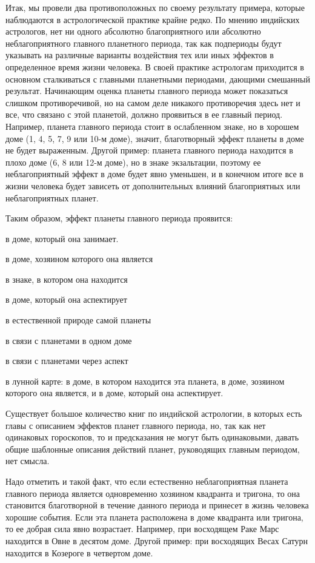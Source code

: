 Итак, мы провели два противоположных по своему результату примера, которые наблюдаются в астрологической практике крайне редко. По мнению индийских астрологов, нет ни одного абсолютно благоприятного или абсолютно неблагоприятного главного планетного периода, так как подпериоды будут указывать на различные варианты воздействия тех или иных эффектов в определенное время жизни человека. В своей практике астрологам приходится в основном сталкиваться с главными планетными периодами, дающими смешанный результат. Начинающим оценка планеты главного периода может показаться слишком противоречивой, но на самом деле никакого противоречия здесь нет и все, что связано с этой планетой, должно проявиться в ее главный период. Например, планета главного периода стоит в ослабленном знаке, но в хорошем доме (1, 4, 5, 7, 9 или 10-м доме), значит, благотворный эффект планеты в доме не будет выраженным. Другой пример: планета главного периода находится в плохо доме (6, 8 или 12-м доме), но в знаке экзальтации, поэтому ее неблагоприятный эффект в доме будет явно уменьшен, и в конечном итоге все в жизни человека будет зависеть от дополнительных влияний благоприятных или неблагоприятных планет.

Таким образом, эффект планеты главного периода проявится:

\begin{myitem}
	\item в доме, который она занимает.
	\item в доме, хозяином которого она является
	\item в знаке, в котором она находится
	\item в доме, который она аспектирует
	\item в естественной природе самой планеты
	\item в связи с планетами в одном доме
	\item в связи с планетами через аспект
	\item в лунной карте: в доме, в котором находится эта планета, в доме, зозяином которого она является, и в доме, который она аспектирует.
\end{myitem}

Существует большое количество книг по индийской астрологии, в которых есть главы с описанием эффектов планет главного периода, но, так как нет одинаковых гороскопов, то и предсказания не могут быть одинаковыми, давать общие шаблонные описания действий планет, руководящих главным периодом, нет смысла.

Надо отметить и такой факт, что если естественно неблагоприятная планета главного периода является одновременно хозяином квадранта и тригона, то она становится благотворной в течение данного периода и принесет в жизнь человека хорошие события. Если эта планета расположена в доме квадранта или тригона, то ее добрая сила явно возрастает. Например, при восходящем Раке Марс находится в Овне в десятом доме. Другой пример: при восходящих Весах Сатурн находится в Козероге в четвертом доме.

